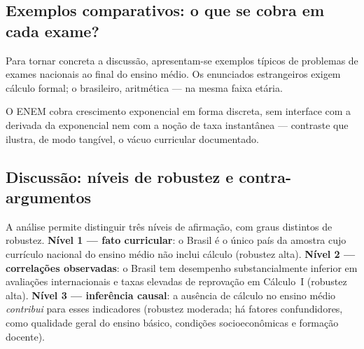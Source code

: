 \documentclass[12pt,a4paper,oneside]{article}
\begin{document}
\subsection{Exemplos comparativos: o que se cobra em cada exame?}

Para tornar concreta a discussão, apresentam-se exemplos típicos de
problemas de exames nacionais ao final do ensino médio. Os enunciados
estrangeiros exigem cálculo formal; o brasileiro, aritmética --- na mesma
faixa etária.

\smallskip
\noindent{}

\smallskip
\noindent{}

\smallskip
\noindent{}

\smallskip
\noindent{}

\smallskip
O ENEM cobra crescimento exponencial em forma discreta, sem interface com
a derivada da exponencial nem com a noção de taxa instantânea ---
contraste que ilustra, de modo tangível, o vácuo curricular documentado.

\subsection{Discussão: níveis de robustez e contra-argumentos}
\label{sec:discussao}

A análise permite distinguir três níveis de afirmação, com graus
distintos de robustez. \textbf{Nível 1 --- fato curricular}: o Brasil é o
único país da amostra cujo currículo nacional do ensino médio não inclui
cálculo (robustez alta). \textbf{Nível 2 --- correlações observadas}: o
Brasil tem desempenho substancialmente inferior em avaliações
internacionais e taxas elevadas de reprovação em Cálculo~I (robustez
alta). \textbf{Nível 3 --- inferência causal}: a ausência de cálculo no
ensino médio \emph{contribui} para esses indicadores (robustez moderada;
há fatores confundidores, como qualidade geral do ensino básico,
condições socioeconômicas e formação docente).
\end{document}
